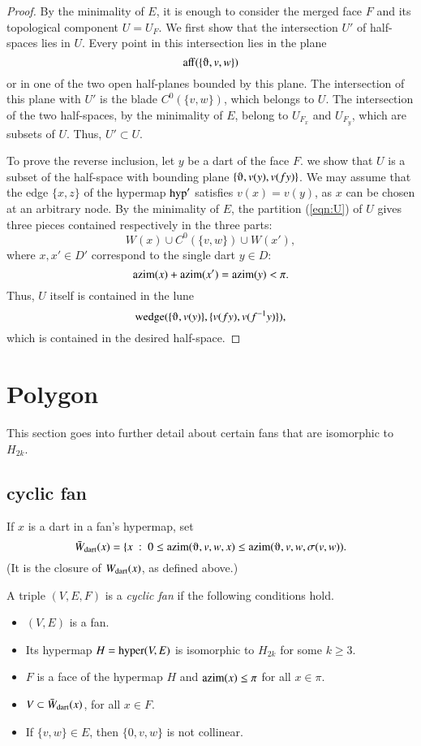 \begin{proof}
By the minimality of $E$, it is enough to consider
the merged face $F$ and its topological component $U=U_F$.
We first show that the intersection $U'$ of half-spaces lies in $U$.
Every point in this intersection lies in the plane
$$
\op{aff}(\{\orgn,v,w\})
$$
or in one of the two open half-planes bounded by this plane.  The intersection
of this plane with $U'$ is the blade $C^0(\{v,w\})$, which belongs
to $U$. The intersection of the two half-spaces, by the minimality of $E$,
belong to $U_{F_x}$ and $U_{F_y}$, which are subsets of $U$.  Thus, $U'\subset U$.

To prove the reverse inclusion, let $y$  be a dart of
the face $F$.  we show that $U$ is a subset of the half-space with bounding
plane $\{\orgn,v(y),v(f y)\}$.  We may assume that the edge $\{x,z\}$ of the
hypermap ${\operatorname{hyp}}'$ satisfies $v(x) = v(y)$, as $x$ can be chosen at an
arbitrary node.  By the minimality of $E$,  
the partition (\ref{eqn:U}) of $U$ gives three pieces
contained respectively in the three parts:
$$
W(x) \cup C^0(\{v,w\}) \cup W(x'),
$$
where $x,x'\in D'$ correspond to the single dart $y\in D$:
$$
{\operatorname{azim}}(x) + {\operatorname{azim}}(x') = {\operatorname{azim}}(y) < \pi.
$$
Thus, $U$ itself is contained in the lune
$$
\op{wedge}(\{\orgn,v(y)\},\{v(f y),v(f^{-1} y)\}),
$$
which is contained in the desired half-space.
\end{proof}

\section{Polygon}

This section goes into further detail about certain fans that are isomorphic to $H_{2k}$.

\subsection{cyclic fan}

If $x$ is a dart in a fan's hypermap, set
$$
\bWdart(x) = \{ x\mid 0\le \op{azim}(\orgn,v,w,x)\le \op{azim}(\orgn,v,w,\sigma(v,w)).
$$
(It is the closure of $W_{\text{dart}}(x)$, as defined above.)

\begin{definition}  A triple $(V,E,F)$ is a {\it cyclic fan} if the following conditions hold.
\begin{itemize} 
\item $(V,E)$ is a fan.
\item Its hypermap $H={\operatorname{hyper}}(V,E)$ is isomorphic to $H_{2k}$ for some $k\ge 3$.
\item $F$ is a face of the hypermap $H$ and ${\operatorname{azim}}(x)\le \pi$ for all $x\in \pi$.
\item $V\subset \bar W_{\text{dart}}(x)$, for all $x\in F$.
\item If $\{v,w\}\in E$, then $\{0,v,w\}$ is not collinear.
\end{itemize}
\end{definition}

